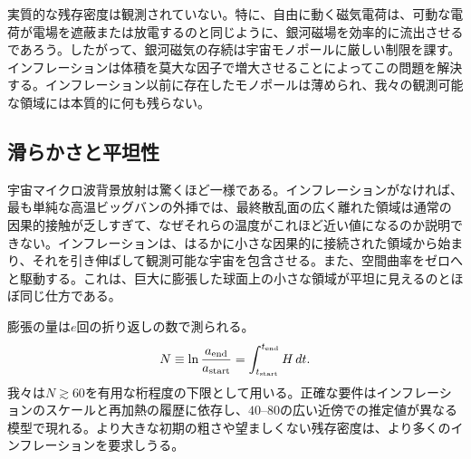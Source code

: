 実質的な残存密度は観測されていない。特に、自由に動く磁気電荷は、可動な電荷が電場を遮蔽または放電するのと同じように、銀河磁場を効率的に流出させるであろう。したがって、銀河磁気の存続は宇宙モノポールに厳しい制限を課す。インフレーションは体積を莫大な因子で増大させることによってこの問題を解決する。インフレーション以前に存在したモノポールは薄められ、我々の観測可能な領域には本質的に何も残らない。

\subsection{滑らかさと平坦性}

宇宙マイクロ波背景放射は驚くほど一様である。インフレーションがなければ、最も単純な高温ビッグバンの外挿では、最終散乱面の広く離れた領域は通常の因果的接触が乏しすぎて、なぜそれらの温度がこれほど近い値になるのか説明できない。インフレーションは、はるかに小さな因果的に接続された領域から始まり、それを引き伸ばして観測可能な宇宙を包含させる。また、空間曲率をゼロへと駆動する。これは、巨大に膨張した球面上の小さな領域が平坦に見えるのとほぼ同じ仕方である。

膨張の量は\(e\)回の折り返しの数で測られる。
\begin{equation}
N\equiv \ln\frac{a_{\rm end}}{a_{\rm start}}
=\int_{t_{\rm start}}^{t_{\rm end}}H\,dt.
\label{eq:c09-efolds}
\end{equation}
我々は\(N\gtrsim60\)を有用な桁程度の下限として用いる。正確な要件はインフレーションのスケールと再加熱の履歴に依存し、\(40\)--\(80\)の広い近傍での推定値が異なる模型で現れる。より大きな初期の粗さや望ましくない残存密度は、より多くのインフレーションを要求しうる。

\begin{classroomqa}
\end{classroomqa}

\begin{classroomqa}
\end{classroomqa}

